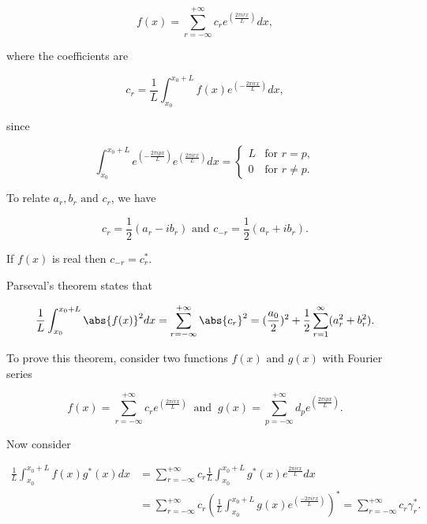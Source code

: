\documentclass[english,a4paper,12pt]{report}
\begin{document}
\begin{equation}
    f(x) = \sum_{r=-\infty}^{+\infty} c_{r} e^{\left( \frac{2\pi i rx}{L}  \right)}dx,  
\end{equation}

where the coefficients are 

\begin{equation}
    c_{r} = \frac{1}{L} \int_{x_0 }^{x_0 + L} f(x)e^{\left( -\frac{2\pi irx}{L}  \right)}dx,     
\end{equation}

since

\begin{equation}
    \int_{x_0 }^{x_0 + L} e^{\left( -\frac{2\pi ipx}{L}\right)} e^{\left( \frac{2\pi irx}{L} \right)} dx = \begin{cases} L & \text{for } r=p, \\ 0 & \text{for } r\neq p.\end{cases}   
\end{equation}

To relate \(a_{r},b_{r} \text { and } c_{r}  \), we have

\begin{equation}
    c_{r} = \frac{1}{2} (a_{r} -ib_{r}  ) \text { and } c_{-r} = \frac{1}{2}(a_{r} + ib_{r}  ).   
\end{equation}

If \(f(x)\) is real then \(c_{-r} = c_{r}^*  \).

Parseval's theorem states that 

\begin{equation}
    \frac{1}{L} \int_{x_0 }^{x_0 + L} \abs{f(x)}^2 dx = \sum_{r=-\infty}^{+\infty} \abs{c_{r} }^2 = (\frac{a_0 }{2} )^2 + \frac{1}{2} \sum_{r=1}^{\infty} (a_{r}^2 + b_{r}^2).         
\end{equation}

To prove this theorem, consider two functions \(f(x) \text { and } g(x)\) with Fourier series 

\begin{equation}
    f(x) = \sum_{r=-\infty}^{+\infty} c_{r} e^{\left( \frac{2\pi irx}{L}  \right)} ~\text { and }~ g(x) = \sum_{p=-\infty}^{+\infty} d_{p} e^{\left( \frac{2\pi ipx}{L}  \right)}.      
\end{equation}

Now consider 

\begin{equation}
    \begin{aligned} 
    \frac{1}{L} \int_{x_0 }^{x_0 + L} f(x)g^*(x)dx &= \sum_{r=-\infty}^{+\infty} c_{r} \frac{1}{L} \int_{x_0 }^{x_0 + L} g^*(x) e^{\frac{2\pi irx}{L} }dx \\ &= \sum_{r=-\infty}^{+\infty} c_{r} \left( \frac{1}{L} \int_{x_0 }^{x_0 + L} g(x) e^{\left( \frac{-2\pi irx}{L}  \right)}   \right)^* = \sum_{r=-\infty}^{+\infty} c_{r} \gamma _{r}^*.            
    \end{aligned} 
\end{equation}
\end{document}
